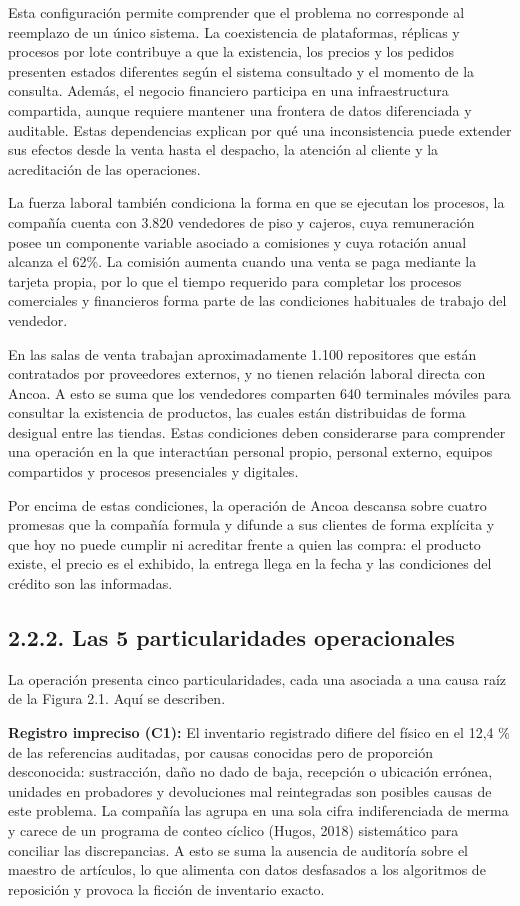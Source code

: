 \documentclass[11pt]{article}
\begin{document}
Esta configuración permite comprender que el problema no corresponde al reemplazo de un único sistema. La coexistencia de plataformas, réplicas y procesos por lote contribuye a que la existencia, los precios y los pedidos presenten estados diferentes según el sistema consultado y el momento de la consulta. Además, el negocio financiero participa en una infraestructura compartida, aunque requiere mantener una frontera de datos diferenciada y auditable. Estas dependencias explican por qué una inconsistencia puede extender sus efectos desde la venta hasta el despacho, la atención al cliente y la acreditación de las operaciones.

La fuerza laboral también condiciona la forma en que se ejecutan los procesos, la compañía cuenta con 3.820 vendedores de piso y cajeros, cuya remuneración posee un componente variable asociado a comisiones y cuya rotación anual alcanza el 62\%. La comisión aumenta cuando una venta se paga mediante la tarjeta propia, por lo que el tiempo requerido para completar los procesos comerciales y financieros forma parte de las condiciones habituales de trabajo del vendedor.

En las salas de venta trabajan aproximadamente 1.100 repositores que están contratados por proveedores externos, y no tienen relación laboral directa con Ancoa. A esto se suma que los vendedores comparten 640 terminales móviles para consultar la existencia de productos, las cuales están distribuidas de forma desigual entre las tiendas. Estas condiciones deben considerarse para comprender una operación en la que interactúan personal propio, personal externo, equipos compartidos y procesos presenciales y digitales.

Por encima de estas condiciones, la operación de Ancoa descansa sobre cuatro promesas que la compañía formula y difunde a sus clientes de forma explícita y que hoy no puede cumplir ni acreditar frente a quien las compra: el producto existe, el precio es el exhibido, la entrega llega en la fecha y las condiciones del crédito son las informadas.

\subsection{2.2.2. Las 5 particularidades operacionales}\label{las-5-particularidades-operacionales}

La operación presenta cinco particularidades, cada una asociada a una causa raíz de la Figura 2.1. Aquí se describen.

\textbf{Registro impreciso (C1):} El inventario registrado difiere del físico en el 12,4 \% de las referencias auditadas, por causas conocidas pero de proporción desconocida: sustracción, daño no dado de baja, recepción o ubicación errónea, unidades en probadores y devoluciones mal reintegradas son posibles causas de este problema. La compañía las agrupa en una sola cifra indiferenciada de merma y carece de un programa de conteo cíclico (Hugos, 2018) sistemático para conciliar las discrepancias. A esto se suma la ausencia de auditoría sobre el maestro de artículos, lo que alimenta con datos desfasados a los algoritmos de reposición y provoca la ficción de inventario exacto.
\end{document}
